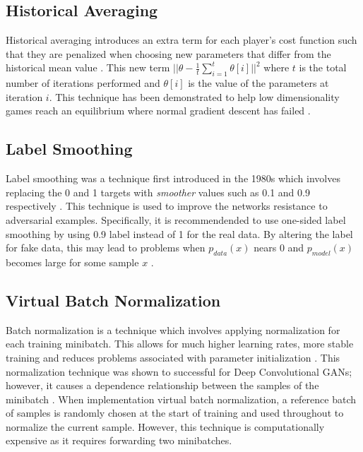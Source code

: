 \documentclass[11pt]{article}
\begin{document}
\subsection{Historical Averaging}
Historical averaging introduces an extra term for each player's cost function such that they are penalized when choosing new parameters that differ from the historical mean value \citep{2016arXiv160603498S}. This new term $||\theta - \frac{1}{t}\sum_{i=1}^{t}\theta[i]||^2$ where $t$ is the total number of iterations performed and $\theta[i]$ is the value of the parameters at iteration $i$. This technique has been demonstrated to help low dimensionality games reach an equilibrium where normal gradient descent has failed \citep{2016arXiv160603498S}.

\subsection{Label Smoothing}
Label smoothing was a technique first introduced in the 1980s which involves replacing the 0 and 1 targets with \textit{smoother} values such as 0.1 and 0.9 respectively \citep{2016arXiv160603498S}. This technique is used to improve the networks resistance to adversarial examples. Specifically, it is recommendended to use one-sided label smoothing by using 0.9 label instead of 1 for the real data. By altering the label for fake data, this may lead to problems when $p_{data}(x)$ nears $0$ and $p_{model}(x)$ becomes large for some sample $x$ \citep{2016arXiv160603498S}.

\subsection{Virtual Batch Normalization}
Batch normalization is a technique which involves applying normalization for each training minibatch. This allows for much higher learning rates, more stable training and reduces problems associated with parameter initialization \citep{2015arXiv150203167I}. This normalization technique was shown to successful for Deep Convolutional GANs; however, it causes a dependence relationship between the samples of the minibatch \citep{2016arXiv160603498S}. When implementation virtual batch normalization, a reference batch of samples is randomly chosen at the start of training and used throughout to normalize the current sample. However, this technique is computationally expensive as it requires forwarding two minibatches.
\end{document}
